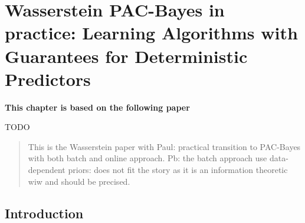 \chapter[Wasserstein PAC-Bayes in practice: Learning Algorithms with Guarantees for Deterministic Predictors]{Wasserstein PAC-Bayes in practice: Learning Algorithms with Guarantees for Deterministic Predictors}
\label{chap:gen-flat-minima}
\addchapterlof
\addchapterloe

\vspace{-2.0cm}
\begin{center}
\textbf{This chapter is based on the following paper}\\[-0.1cm]
\end{center}
TODO

\vspace{0.2cm}
\minitoc

\begin{abstract}
\vspace{-0.2cm}
This is the Wasserstein paper with Paul: practical transition to PAC-Bayes with both batch and online approach. Pb: the batch approach use data-dependent priors: does not fit the story as it is an information theoretic wiw and should be precised.
\end{abstract}

\newpage
    
\section{Introduction}
